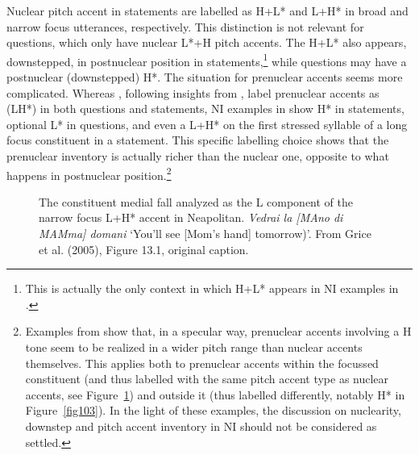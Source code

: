 Nuclear pitch accent in statements are labelled as H+L* and L+H* in broad and narrow focus utterances, respectively. This distinction is not relevant for questions, which only have nuclear L*+H pitch accents. The H+L* also appears, downstepped, in postnuclear position in statements,\footnote{This is actually the only context in which H+L* appears in NI examples in \citet{grice2005strategy}.} while questions may have a postnuclear (downstepped) H*. The situation for prenuclear accents seems more complicated. Whereas \citet{petrone2011tones}, following insights from \citet{prieto2005pitch}, label prenuclear accents as (LH*) in both questions and statements, NI examples in \citet{grice2005strategy} show H* in statements, optional L* in questions, and even a L+H* on the first stressed syllable of a long focus constituent in a statement. This specific labelling choice shows that the prenuclear inventory is actually richer than the nuclear one, opposite to what happens in postnuclear position.\footnote{Examples from \citet{grice2005strategy} show that, in a specular way, prenuclear accents involving a H tone seem to be realized in a wider pitch range than nuclear accents themselves. This applies both to prenuclear accents within the focussed constituent (and thus labelled with the same pitch accent type as nuclear accents, see Figure~\ref{fig102}) and outside it (thus labelled differently, notably H* in Figure~\ref{fig103}). In the light of these examples, the discussion on nuclearity, downstep and pitch accent inventory in NI should not be considered as settled.}

\begin{figure}
\centering
{}
\caption{The constituent medial fall analyzed as the L component of the narrow focus L+H* accent in Neapolitan. \textit{Vedrai la [MAno di MAMma] domani} `You'll see [Mom's hand] tomorrow)'. From Grice et al. (2005), Figure 13.1, original caption.}
\label{fig102}\end{figure}

